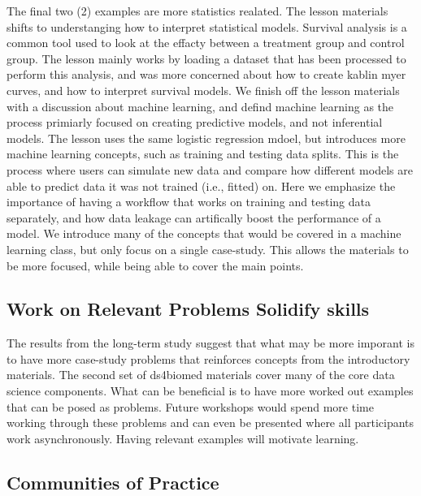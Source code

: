 \documentclass[030-workshop.tex]{subfiles}
\begin{document}
            The final two (2) examples are more statistics realated.
            The lesson materials shifts to understanging how to interpret statistical models.
            Survival analysis is a common tool used to look at the effacty between a treatment group and control group.
            The lesson mainly works by loading a dataset that has been processed to perform this analysis,
            and was more concerned about how to create kablin myer curves, and how to interpret survival models.
            We finish off the lesson materials with a discussion about machine learning,
            and defind machine learning as the process primiarly focused on creating predictive models,
            and not inferential models.
            The lesson uses the same logistic regression mdoel,
            but introduces more machine learning concepts, such as training and testing data splits.
            This is the process where users can simulate new data and compare how different models are able to predict data it was not trained (i.e., fitted) on.
            Here we emphasize the importance of having a workflow that works on training and testing data separately,
            and how data leakage can artifically boost the performance of a model.
            We introduce many of the concepts that would be covered in a machine learning class,
            but only focus on a single case-study.
            This allows the materials to be more focused,
            while being able to cover the main points.

        \subsection{Work on Relevant Problems Solidify skills}

            The results from the long-term study suggest that what may be more imporant is to have
            more case-study problems that reinforces concepts from the introductory materials.
            The second set of ds4biomed materials cover many of the core data science components.
            What can be beneficial is to have more worked out examples that can be posed as problems.
            Future workshops would spend more time working through these problems and can even be presented
            where all participants work asynchronously.
            Having relevant examples will motivate learning.


    \subsection{Communities of Practice}
\end{document}

